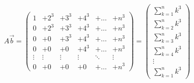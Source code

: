 \documentclass[a4paper,12pt]{article}
\begin{document}
\[
    A\vec b=\begin{pmatrix}
        1      & +2^3   & +3^3   & +4^3   & +\dots & +n^3   \\
        0      & +2^3   & +3^3   & +4^3   & +\dots & +n^3   \\
        0      & +0     & +3^3   & +4^3   & +\dots & +n^3   \\
        0      & +0     & +0     & +4^3   & +\dots & +n^3   \\
        \vdots & \vdots & \vdots & \vdots & \ddots & \vdots \\
        0      & +0     & +0     & +0     & +\dots & +n^3
    \end{pmatrix}=\begin{pmatrix}
        \sum_{k=1}^nk^3\\\sum_{k=2}^nk^3\\\sum_{k=3}^nk^3\\\sum_{k=4}^nk^3\\\vdots\\\sum_{k=1}^nk^3\end{pmatrix}
\]
\end{document}
